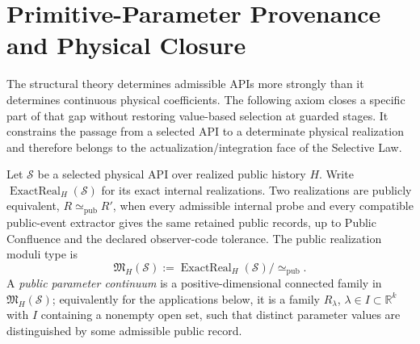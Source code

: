 
\section{Primitive-Parameter Provenance and Physical Closure}
\label{sec:parameter-provenance}

The structural theory determines admissible APIs more strongly than it determines
continuous physical coefficients.  The following axiom closes a specific part of
that gap without restoring value-based selection at guarded stages.  It constrains
the passage from a selected API to a determinate physical realization and therefore
belongs to the actualization/integration face of the Selective Law.

\begin{definition}
Let \(\mathcal S\) be a selected physical API over realized public history \(H\).
Write \(\operatorname{ExactReal}_H(\mathcal S)\) for its exact internal
realizations.  Two realizations are publicly equivalent,
\(R\simeq_{\mathrm{pub}}R'\), when every admissible internal probe and every
compatible public-event extractor gives the same retained public records, up to
Public Confluence and the declared observer-code tolerance.  The public realization
moduli type is
\[
 \mathfrak M_H(\mathcal S)
 :=
 \operatorname{ExactReal}_H(\mathcal S)/{\simeq_{\mathrm{pub}}}.
\]
A \emph{public parameter continuum} is a positive-dimensional connected family in
\(\mathfrak M_H(\mathcal S)\); equivalently for the applications below, it is a
family \(R_\lambda\), \(\lambda\in I\subset\mathbb R^k\) with \(I\) containing a
nonempty open set, such that distinct parameter values are distinguished by some
admissible public record.
\end{definition}

